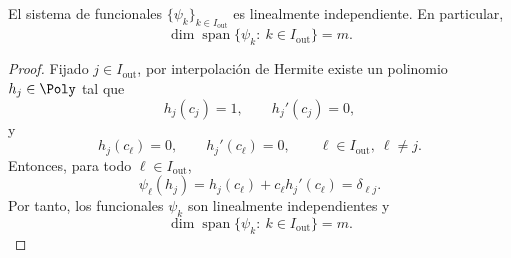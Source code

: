 \begin{lem}\label{lem:independencia_funcionales_psi}
	El sistema de funcionales $\{\psi_k\}_{k\in I_{\mathrm{out}}}$ es linealmente independiente. En particular,
	\[
		\dim \operatorname{span}\{\psi_k:\ k\in I_{\mathrm{out}}\}=m.
	\]
\end{lem}
\begin{proof}
	Fijado $j\in I_{\mathrm{out}}$, por interpolación de Hermite existe un polinomio $h_j\in\Poly$ tal que
	\[
		h_j(c_j)=1,\qquad h_j'(c_j)=0,
	\]
	y
	\[
		h_j(c_\ell)=0,\qquad h_j'(c_\ell)=0,
		\qquad \ell\in I_{\mathrm{out}},\ \ell\neq j.
	\]
	Entonces, para todo $\ell\in I_{\mathrm{out}}$,
	\[
		\psi_\ell(h_j)=h_j(c_\ell)+c_\ell h_j'(c_\ell)=\delta_{\ell j}.
	\]
	Por tanto, los funcionales $\psi_k$ son linealmente independientes y
	\[
		\dim \operatorname{span}\{\psi_k:\ k\in I_{\mathrm{out}}\}=m.
	\]
\end{proof}

